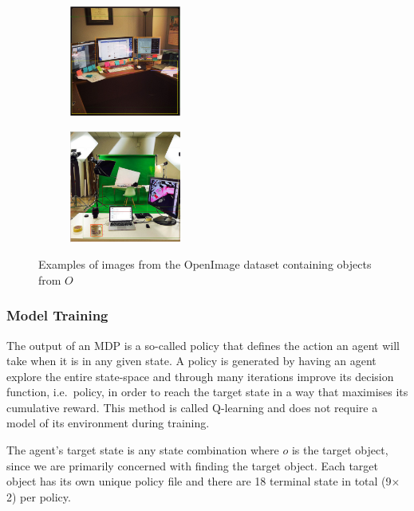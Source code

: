 \documentclass[a4paper, twoside]{article}
\begin{document}
\begin{figure}
  \centering
  \begin{subfigure}
    \centering
    \includegraphics[width=0.4\textwidth]{figures/desk_example.png}
  \end{subfigure}
  \begin{subfigure}
    \centering
    \includegraphics[width=0.4\textwidth]{figures/mug_example.png}
  \end{subfigure}
  \caption{Examples of images from the OpenImage dataset containing objects from $\mathit{O}$~\cite{openimages}}\label{fig:openimage-example}
\end{figure}

\subsubsection{Model Training}

\noindent The output of an MDP is a so-called policy that defines the action an agent will take when it is in any given state. A policy is generated by having an agent explore the entire state-space and through many iterations improve its decision function, i.e.\ policy, in order to reach the target state in a way that maximises its cumulative reward. This method is called Q-learning and does not require a model of its environment during training. 

The agent's target state is any state combination where $o$ is the target object, since we are primarily concerned with finding the target object. Each target object has its own unique policy file and there are 18 terminal state in total (9$\times$2) per policy.
\end{document}
